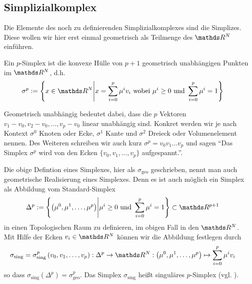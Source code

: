   \subsection{Simplizialkomplex}
    
    Die Elemente des noch zu definierenden Simplizialkomplexes sind die Simplizes.
    Diese wollen wir hier erst einmal geometrisch als Teilmenge des \( \R^{N} \) einführen.

    \begin{definition}
      \label{defSimplex}
      Ein \( p \)-Simplex ist die konvexe Hülle von \( p+1 \) geometrisch unabhängigen Punkten im \( \R^{N} \), d.h.
      \begin{align}
        \sigma^{p} &:= \left\{  x \in \R^{N} \middle| x = \sum_{i=0}^{p}\mu^{i}v_{i} \text{ wobei } \mu^{i} \ge 0  \text{ und } \sum_{i=0}^{p}\mu^{i} = 1 \right\}
      \end{align}
    \end{definition}
    
    Geometrisch unabhängig bedeutet dabei, dass die \( p \) Vektoren \( v_{1} - v_{0}, v_{2} - v_{0},\ldots,  v_{p} - v_{0} \) linear unabhängig sind.
    Konkret werden wir je nach Kontext \( \sigma^{0} \) Knoten oder Ecke, \( \sigma^{1} \) Kante und \( \sigma^{2} \) Dreieck oder Volumenelement nennen.
    Des Weiteren schreiben wir auch kurz \( \sigma^{p} = v_{0} v_{1} \ldots v_{p} \) und sagen 
    "`Das Simplex \( \sigma^{p} \) wird von den Ecken \( \{ v_{0}, v_{1}, \ldots, v_{p}\} \) aufgespannt."'.

    \begin{bemerkung}
      \label{singSimplex}
      \label{refSingSimplex}
      Die obige Defintion eines Simplexes, hier als \( \sigma_{\text{geo}} \) geschrieben, nennt man auch geometrische Realisierung eines Simplexes.
      Denn es ist auch möglich ein Simplex als Abbildung vom Standard-Simplex 
        \begin{align} 
          \Delta^{p} &:= \left\{\left( \mu^{0},\mu^{1},\ldots,\mu^{p} \right) \middle| \mu^{i} \ge 0  \text{ und } \sum_{i=0}^{p}\mu^{i} = 1 \right\} \subset
        \R^{p+1} 
        \end{align}
      in einen Topologischen Raum zu definieren, im obigen Fall in den \( \R^{N} \). 
      Mit Hilfe der Ecken \( v_{i}\in\R^{N} \) können wir die Abbildung festlegen durch
      \begin{align}
        \sigma_{\text{sing}} = \sigma^{p}_{\text{sing}}\left( v_{0}, v_{1}, \ldots, v_{p} \right) : \Delta^{p} &\rightarrow \R^{N}
                        : \left( \mu^{0},\mu^{1},\ldots,\mu^{p} \right)\mapsto \sum_{i=0}^{p}\mu^{i}v_{i}
      \end{align}
      so dass \( \sigma_{\text{sing}}(\Delta^{p}) = \sigma^{p}_{\text{geo}} \).
      Das Simplex \(\sigma_{\text{sing}}\) heißt singuläres \( p \)-Simplex (vgl. \cite{lueck}).
    \end{bemerkung}

